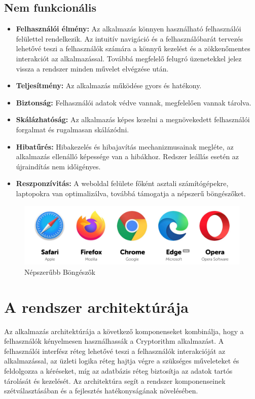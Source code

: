 \newpage
\subsection{Nem funkcionális}

\begin{itemize}
	\item\textbf{Felhasználói élmény:} Az alkalmazás könnyen használható felhasználói felülettel rendelkezik. Az intuitív navigáció és a felhasználóbarát tervezés lehetővé teszi a felhasználók számára a könnyű kezelést és a zökkenőmentes interakciót az alkalmazással. Továbbá megfelelő felugró üzenetekkel jelez vissza a rendszer minden művelet elvégzése után.

	\item\textbf{Teljesítmény:} Az alkalmazás működése gyors és hatékony.

	\item\textbf{Biztonság:} Felhasználói adatok védve vannak, megfelelően vannak tárolva.

	\item\textbf{Skálázhatóság:} Az alkalmazás képes kezelni a megnövekedett felhasználói forgalmat és rugalmasan skálázódni.

	\item\textbf{Hibatűrés:} Hibakezelés és hibajavítás mechanizmusainak megléte, az alkalmazás ellenálló képessége van a hibákhoz. Redszer leállás esetén az újraindítás nem időigényes.

	\item\textbf{Reszponzívitás:} A weboldal felülete főként asztali számítógépekre, laptopokra van optimalizálva, továbbá támogatja a népszerű böngészőket.
\end{itemize}

\begin{figure}[!h]
	\centering
	\includegraphics[scale=0.12]{images/webBrowsers}
	\caption{Népszerűbb Böngészők}
\end{figure}

\newpage
\section{A rendszer architektúrája}
Az alkalmazás architektúrája a következő komponenseket kombinálja, hogy a felhasználók kényelmesen használhassák a Cryptorithm alkalmazást. A felhasználói interfész réteg lehetővé teszi a felhasználók interakcióját az alkalmazással, az üzleti logika réteg hajtja végre a szükséges műveleteket és feldolgozza a kéréseket, míg az adatbázis réteg biztosítja az adatok tartós tárolását és kezelését. Az architektúra segít a rendszer komponenseinek szétválasztásában és a fejlesztés hatékonyságának növelésében.

